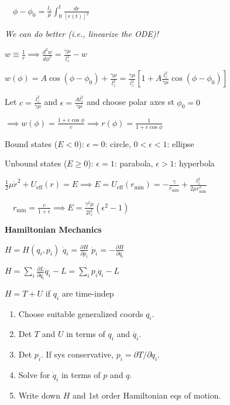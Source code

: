 \documentclass[twocolumn]{article}
\begin{document}
$\quad \phi - \phi_0 = \frac{l_z}{\mu} \int_0^t \frac{dr}{[r(t)]^2}$

\textit{We can do better (i.e., linearize the ODE)!}

$w \equiv \frac{1}{r} \implies \frac{d^2 w}{d\phi^2} = \frac{\gamma \mu}{l_z^2} - w$

$w(\phi) = A \cos(\phi - \phi_0) + \frac{\gamma \mu}{l_z^2} = \frac{\gamma \mu}{l_z^2} \left[ 1 + A \frac{l_z^2}{\gamma \mu} \cos(\phi-\phi_0) \right]$

Let $c = \frac{l_z^2}{\gamma \mu}$ and $\epsilon = \frac{Al_z^2}{\gamma \mu}$ and choose polar axes st $\phi_0 = 0$

$\implies w(\phi) = \frac{1+\epsilon \cos \phi}{c} \implies r(\phi) = \frac{1}{1+\epsilon \cos \phi}$


\newpage


Bound states ($E < 0$): $\epsilon = 0$: circle, $0 < \epsilon < 1$: ellipse

Unbound states ($E \geq 0$): $\epsilon = 1$: parabola, $\epsilon > 1$: hyperbola

$\frac{1}{2} \mu \dot r^2 + U_{\text{eff}}(r) = E \implies E = U_{\text{eff}}(r_{\text{min}}) = -\frac{\gamma}{r_{\text{min}}} + \frac{l_z^2}{2 \mu r^2_{\text{min}}}$

$\quad r_{\text{min}} = \frac{c}{1+\epsilon} \implies E = \frac{\gamma^2 \mu}{2l_z^2} (\epsilon^2-1)$

\dotfill

\textbf{Hamiltonian Mechanics}

$H = H(q_i, p_i)$ \hfill $\dot q_i = \frac{\partial H}{\partial p_i}$ \hfill $\dot p_i = -\frac{\partial H}{\partial q_i}$

$H = \sum_i \frac{\partial L}{\partial \dot q_i} \dot q_i - L = \sum_i p_i \dot q_i - L$

$H = T + U$ if $q_i$ are time-indep

\begin{enumerate}
    \item Choose suitable generalized coords $q_i$.
    \item Det $T$ and $U$ in terms of $q_i$ and $\dot q_i$.
    \item Det $p_i$. If sys conservative, $p_i = \partial T / \partial \dot q_i$.
    \item Solve for $\dot q_i$ in terms of $p$ and $q$.
    \item Write down $H$ and 1st order Hamiltonian eqs of motion.
\end{enumerate}
\end{document}

